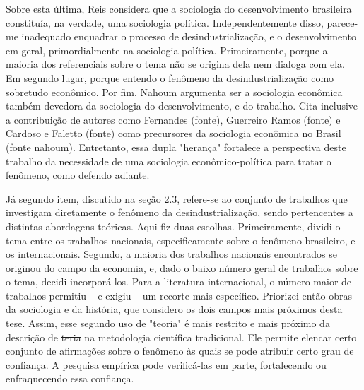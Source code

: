 Sobre esta última, Reis  considera que a sociologia do desenvolvimento brasileira constituía, na verdade, uma sociologia política. Independentemente disso, parece-me inadequado enquadrar o processo de desindustrialização, e o desenvolvimento em geral, primordialmente na sociologia política. Primeiramente, porque a maioria dos referenciais sobre o tema não se origina dela nem dialoga com ela. Em segundo lugar, porque entendo o fenômeno da desindustrialização como sobretudo econômico. Por fim, Nahoum  argumenta ser a sociologia econômica também devedora da sociologia do desenvolvimento, e do trabalho. Cita inclusive a contribuição de autores como Fernandes (fonte), Guerreiro Ramos (fonte) e Cardoso e Faletto (fonte) como precursores da sociologia econômica no Brasil (fonte nahoum). Entretanto, essa dupla "herança" fortalece a perspectiva deste trabalho da necessidade de uma sociologia econômico-política para tratar o fenômeno, como defendo adiante.

Já  segundo item, discutido na seção 2.3, refere-se ao conjunto de trabalhos que investigam diretamente
o fenômeno da desindustrialização, sendo pertencentes a distintas abordagens teóricas. Aqui fiz duas escolhas. Primeiramente, dividi o tema entre os trabalhos nacionais, especificamente sobre o fenômeno brasileiro, e os internacionais. Segundo, a maioria dos trabalhos nacionais encontrados se originou do campo da economia, e, dado o baixo número geral de trabalhos sobre o tema, decidi incorporá-los. Para a literatura internacional, o número maior
de trabalhos permitiu -- e exigiu -- um recorte mais específico. Priorizei então obras da sociologia e da história, que considero os dois campos mais próximos desta tese. Assim, esse segundo uso de "teoria" é mais restrito e
mais próximo da descrição de \sout{teria} na metodologia científica tradicional. Ele permite elencar certo conjunto
de afirmações sobre o fenômeno às quais se pode atribuir certo grau de confiança. A pesquisa empírica pode verificá-las em parte, fortalecendo ou enfraquecendo essa confiança.

